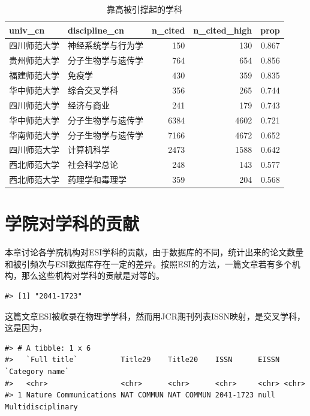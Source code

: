 \documentclass[cn, 11pt, fancy, hide]{elegantbook}
\begin{document}
\begin{table}[!h]

\caption{\label{tab:unnamed-chunk-24}靠高被引撑起的学科}
\centering
\begin{tabular}[t]{llrrr}
\toprule
univ\_cn & discipline\_cn & n\_cited & n\_cited\_high & prop\\
\midrule
四川师范大学 & 神经系统学与行为学 & 150 & 130 & 0.867\\
贵州师范大学 & 分子生物学与遗传学 & 764 & 654 & 0.856\\
福建师范大学 & 免疫学 & 430 & 359 & 0.835\\
华中师范大学 & 综合交叉学科 & 356 & 265 & 0.744\\
四川师范大学 & 经济与商业 & 241 & 179 & 0.743\\
\addlinespace
华中师范大学 & 分子生物学与遗传学 & 6384 & 4602 & 0.721\\
华南师范大学 & 分子生物学与遗传学 & 7166 & 4672 & 0.652\\
四川师范大学 & 计算机科学 & 2473 & 1588 & 0.642\\
西北师范大学 & 社会科学总论 & 248 & 143 & 0.577\\
西北师范大学 & 药理学和毒理学 & 359 & 204 & 0.568\\
\bottomrule
\end{tabular}
\end{table}

\hypertarget{collegecontr}{%
\chapter{学院对学科的贡献}\label{collegecontr}}

本章讨论各学院机构对ESI学科的贡献，由于数据库的不同，统计出来的论文数量和被引频次与ESI数据库存在一定的差异。按照ESI的方法，一篇文章若有多个机构，那么这些机构对学科的贡献是对等的。

\begin{verbatim}
#> [1] "2041-1723"
\end{verbatim}

这篇文章ESI被收录在物理学学科，然而用JCR期刊列表ISSN映射，是交叉学科，这是因为，

\begin{verbatim}
#> # A tibble: 1 x 6
#>   `Full title`          Title29    Title20    ISSN      EISSN `Category name`  
#>   <chr>                 <chr>      <chr>      <chr>     <chr> <chr>            
#> 1 Nature Communications NAT COMMUN NAT COMMUN 2041-1723 null  Multidisciplinary
\end{verbatim}
\end{document}
